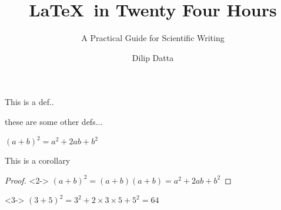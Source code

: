 \documentclass{beamer}
\title[\LaTeX\ in 24H]{\LaTeX\ in Twenty Four Hours}
\subtitle{A Practical Guide for Scientific Writing}
\author[D. Datta]{Dilip Datta}
\begin{document}
 
    \begin{frame}[t]

        \begin{definition}
            This is a def..
        \end{definition}
        \begin{definitions}
            these are some other defs...
        \end{definitions}
        \begin{theorem}
        $(a+b)^2 = a^2 + 2ab + b^2$
        \end{theorem}
        \begin{corollary}[1]
            This is a corollary
        \end{corollary}
        \begin{proof}<2->
        $(a+b)^2=(a+b)(a+b)=a^2+2ab+b^2$
        \end{proof}
        \begin{example}<3->
        $(3+5)^2=3^2+2\times3\times5+5^2=64$
        \end{example}
        
    \end{frame}
\end{document}
